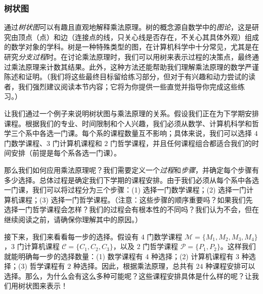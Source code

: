 \subsubsection*{树状图}

通过\emph{树状图}可以有趣且直观地解释乘法原理。树的概念源自数学中的\emph{图论}，这是研究由顶点（点）和边（连接点的线，只关心线是否存在，不关心其具体外观）组成的数学对象的学科。树是一种特殊类型的图，在计算机科学中十分常见，尤其是在研究\emph{分支过程}时。在讨论乘法原理时，我们可以用树来表示过程的决策点，最终通过乘法原理来计数其结果。此外，这种方法还能帮助我们理解乘法原理的数学严谨陈述和证明。（我们将这些最终目标留给练习部分，但对于有兴趣和动力尝试的读者，我们强烈建议阅读本节内容；它将为你提供一些直觉并指导你完成这些练习。）\\

\begin{example}
    让我们通过一个例子来说明树状图与乘法原理的关系。假设我们正在为下学期安排课程。根据我们的专业、时间限制和个人兴趣，我们必须从数学、计算机科学和哲学三个系中各选一门课。每个系的课程数量互不影响；具体来说，我们可以选择 $4$ 门数学课程、$3$ 门计算机课程和 $2$ 门哲学课程，并且任何课程组合都适合我们的时间安排（前提是每个系各选一门课）。

    那么我们如何应用乘法原理呢？我们需要定义一个\emph{过程}和\emph{步骤}，并确定每个步骤有多少选择。总体过程是确定我们下学期的课程安排。由于我们必须从每个系中各选一门课，我们可以将过程分为三个步骤：(1) 选择一门数学课程；(2) 选择一门计算机课程；(3) 选择一门哲学课程。（注意：这些步骤的顺序重要吗？如果我们先选择一门哲学课程会怎样？我们的过程会有根本性的不同吗？我们认为不会，但在继续阅读之前，请确保你理解其中的原因。）

    接下来，我们来看看每一步的选择。假设有 $4$ 门数学课程 $\mathcal{M} = \{M_1, M_2, M_3, M_4\}$，$3$ 门计算机课程 $\mathcal{C} = \{C_1, C_2, C_3\}$，以及 $2$ 门哲学课程 $\mathcal{P} = \{P_1, P_2\}$。这样我们就能明确每一步的选择数量：(1) 数学课程有 $4$ 种选择；(2) 计算机课程有 $3$ 种选择；(3) 哲学课程有 $2$ 种选择。因此，根据乘法原理，总共有 $24$ 种课程安排可以选择。那么，为什么会有这么多种可能呢？这些课程安排具体是什么样的呢？让我们用树状图来表示！


\end{example}
